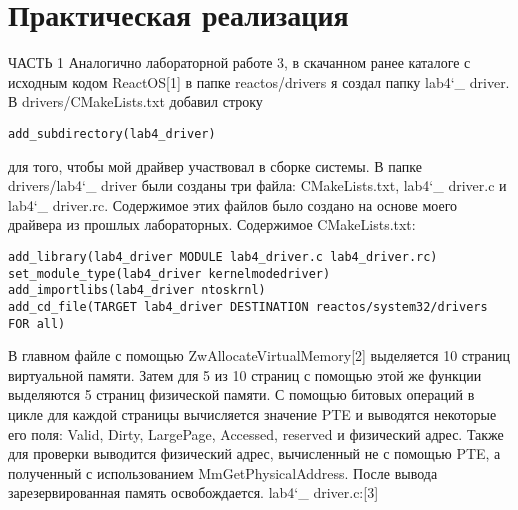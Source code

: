 \documentclass[a4paper, 14pt]{extarticle}
\begin{document}
\section{Практическая реализация} \label{sec:Realization}
\begin{flushleft}
ЧАСТЬ 1 \newline
Аналогично лабораторной работе 3, в скачанном ранее каталоге с исходным кодом ReactOS[1] в папке reactos/drivers я создал папку lab4\char`_ driver. В drivers/CMakeLists.txt добавил строку 
\end{flushleft}

\begin{verbatim}
add_subdirectory(lab4_driver)
\end{verbatim}

\begin{flushleft}
 для того, чтобы мой драйвер участвовал в сборке
системы. В папке drivers/lab4\char`_ driver были созданы три файла: CMakeLists.txt, lab4\char`_ driver.c и lab4\char`_ driver.rc. Содержимое этих файлов было создано на основе моего драйвера из прошлых лабораторных. Содержимое CMakeLists.txt:
\end{flushleft}

\begin{verbatim}
add_library(lab4_driver MODULE lab4_driver.c lab4_driver.rc)
set_module_type(lab4_driver kernelmodedriver)
add_importlibs(lab4_driver ntoskrnl)
add_cd_file(TARGET lab4_driver DESTINATION reactos/system32/drivers FOR all)
\end{verbatim}

\begin{flushleft}
В главном файле с помощью ZwAllocateVirtualMemory[2] выделяется 10 страниц виртуальной памяти. Затем для 5 из 10 страниц с помощью этой же функции выделяются 5 страниц физической памяти. С помощью битовых операций в цикле для каждой страницы вычисляется значение PTE и выводятся некоторые его поля: Valid, Dirty, LargePage, Accessed, reserved и физический адрес. Также для проверки выводится физический адрес, вычисленный не с помощью PTE, а полученный с использованием MmGetPhysicalAddress. После вывода зарезервированная память освобождается.\newline
lab4\char`_ driver.c:[3]
\end{flushleft}
\end{document}
